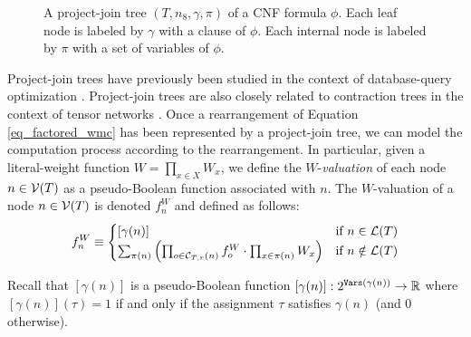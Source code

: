 \begin{figure}%
    \centering
\caption{
    A project-join tree $(T, n_{8}, \gamma, \pi)$ of a CNF formula $\phi$.
    Each leaf node is labeled by $\gamma$ with a clause of $\phi$.
    Each internal node is labeled by $\pi$ with a set of variables of $\phi$.
}
\label{fig_join_tree}
\end{figure}

Project-join trees have previously been studied in the context of database-query optimization \cite{MPPV04}.
Project-join trees are also closely related to contraction trees in the context of tensor networks \cite{EP14}.
Once a rearrangement of Equation \eqref{eq_factored_wmc} has been represented by a project-join tree, we can model the computation process according to the rearrangement.
In particular, given a literal-weight function $W = \prod_{x \in X} W_x$, we define the $W$-\emph{valuation} of each node $n \in \mathcal{V}(T)$ as a pseudo-Boolean function associated with $n$.
The $W$-valuation of a node $n \in \mathcal{V}(T)$ is denoted $f^W_n$ and defined as follows:
\begin{equation}
\label{eq_valuation}
    f^W_n \equiv
    \begin{cases}
       [\gamma(n)] & \text{if}~n \in \mathcal{L}(T) \\
        \sum_{\pi(n)} \left(  \prod_{o \in \mathcal{C}_{T,r}(n)} f^W_o \cdot \prod_{x \in \pi(n)} W_x  \right) & \text{if}~n \notin \mathcal{L}(T)
    \end{cases}
\end{equation}

Recall that $[\gamma(n)]$ is a pseudo-Boolean function $[\gamma(n)] : 2^{\texttt{\upshape Vars}(\gamma(n))} \rightarrow \mathbb{R}$ where $[\gamma(n)](\tau) = 1$ if and only if the assignment $\tau$ satisfies $\gamma(n)$ (and 0 otherwise). 

